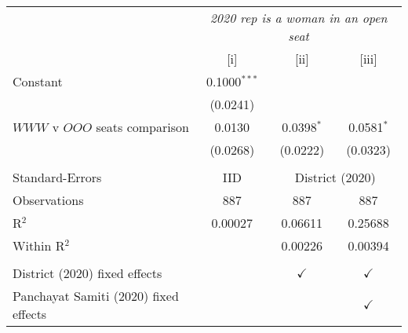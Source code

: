 
\begingroup
\centering
\begin{tabular}{lccc}
   \toprule
    & \multicolumn{3}{c}{\textit{2020 rep is a woman in an open seat}}\\
                                         & [i]            & [ii]          & [iii]\\  
   \midrule 
   Constant                              & 0.1000$^{***}$ &               &   \\   
                                         & (0.0241)       &               &   \\   
   $WWW$ v $OOO$ seats comparison        & 0.0130         & 0.0398$^{*}$  & 0.0581$^{*}$\\   
                                         & (0.0268)       & (0.0222)      & (0.0323)\\   
    \\
   Standard-Errors & IID & \multicolumn{2}{c}{District (2020)} \\ 
   Observations                          & 887            & 887           & 887\\  
   R$^2$                                 & 0.00027        & 0.06611       & 0.25688\\  
   Within R$^2$                          &                & 0.00226       & 0.00394\\  
    \\
   District (2020) fixed effects         &                & $\checkmark$  & $\checkmark$\\   
   Panchayat Samiti (2020) fixed effects &                &               & $\checkmark$\\   
   \bottomrule
\end{tabular}
\par\endgroup


